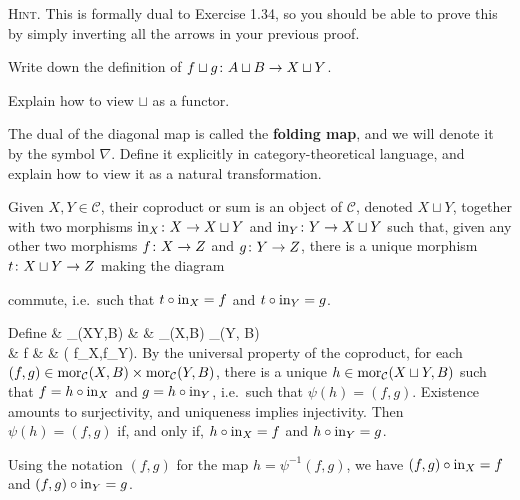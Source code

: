{\scshape Hint}. This is formally dual to Exercise 1.34, so you should be able to prove this by simply inverting all the arrows in your previous proof.
\item Write down the definition of $f \sqcup g \colon A \sqcup B \to X \sqcup Y$.
\item Explain how to view $\sqcup$ as a functor.
\item The dual of the diagonal map is called the \textbf{folding map}, and we will denote it by the symbol $\nabla$. Define it explicitly in category-theoretical language, and explain how to view it as a natural transformation.
\een
\ep

\bs
\ben[label=(\alph*)]
\item Given $X,Y\in\mathcal{C}$, their coproduct or sum is an object of $\mathcal{C}$, denoted $X \sqcup Y$, together with two morphisms $\mathrm{in}_X\colon X\to X\sqcup Y$ and $\mathrm{in}_Y\colon Y\to X\sqcup Y$ such that, given any other two morphisms $f\colon X\to Z$ and $g\colon Y\to Z$, there is a unique morphism $t\colon X\sqcup Y\to Z$ making the diagram
\bse
{}
\ese
commute, i.e.\ such that $t\circ \mathrm{in}_X=f$ and $t\circ \mathrm{in}_Y=g$. 

\item Define
\psi\cl & \mor_{}(X\sqcup Y,B) & \to & \mor_{}(X,B) \times \mor_{}(Y, B) \\
& f & \mapsto & ( f\circ \inj_X,f\circ \inj_Y).
\ei
By the universal property of the coproduct, for each $(f,g)\in \operatorname{mor}_{\mathcal{C}}(X,B) \times \operatorname{mor}_{\mathcal{C}}(Y, B)$, there is a unique $h\in\operatorname{mor}_{\mathcal{C}}(X\sqcup Y,B)$ such that $f= h\circ \mathrm{in}_X$ and $g=h\circ \mathrm{in}_Y$, i.e.\ such that $\psi(h)=(f,g)$. Existence amounts to surjectivity, and uniqueness implies injectivity. Then $\psi(h)=(f,g)$ if, and only if, $h\circ\mathrm{in}_X=f$ and $h\circ\mathrm{in}_Y=g$. 

Using the notation $(f,g)$ for the map $h=\psi^{-1}(f,g)$, we have $(f,g)\circ\mathrm{in}_X=f$ and $(f,g)\circ\mathrm{in}_Y=g$.

